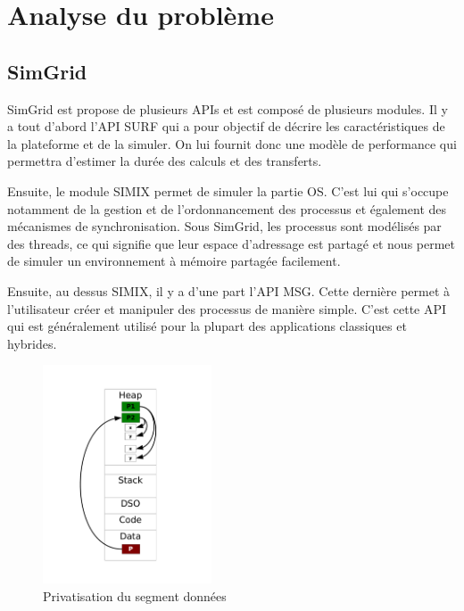 \documentclass[smallextended]{svjour3}
\begin{document}
\section{Analyse du problème}
\label{sec-3}
\subsection{SimGrid}
\label{sec-3-1}
SimGrid est propose de plusieurs APIs et est composé de plusieurs
modules. Il y a tout d'abord l'API SURF qui a pour objectif de
décrire les caractéristiques de la plateforme et de la simuler. On
lui fournit donc une modèle de performance qui permettra d'estimer
la durée des calculs et des transferts.

Ensuite, le module SIMIX permet de simuler la partie OS. C'est lui
qui s'occupe notamment de la gestion et de l'ordonnancement des
processus et également des mécanismes de synchronisation. Sous
SimGrid, les processus sont modélisés par des threads, ce qui
signifie que leur espace d'adressage est partagé et nous permet
de simuler un environnement à mémoire partagée facilement. 

Ensuite, au dessus SIMIX, il y a d'une part l'API MSG. Cette dernière
permet à l'utilisateur créer et manipuler des processus de manière
simple. C'est cette API qui est généralement utilisé pour la
plupart des applications classiques et hybrides. 

\begin{figure}
\vspace{-15mm}
\begin{center}
\includegraphics[width=5cm]{./Img/Memoire.pdf}
\end{center}
\caption{\label{fig:1}Privatisation du segment données}
\end{figure}
\end{document}
